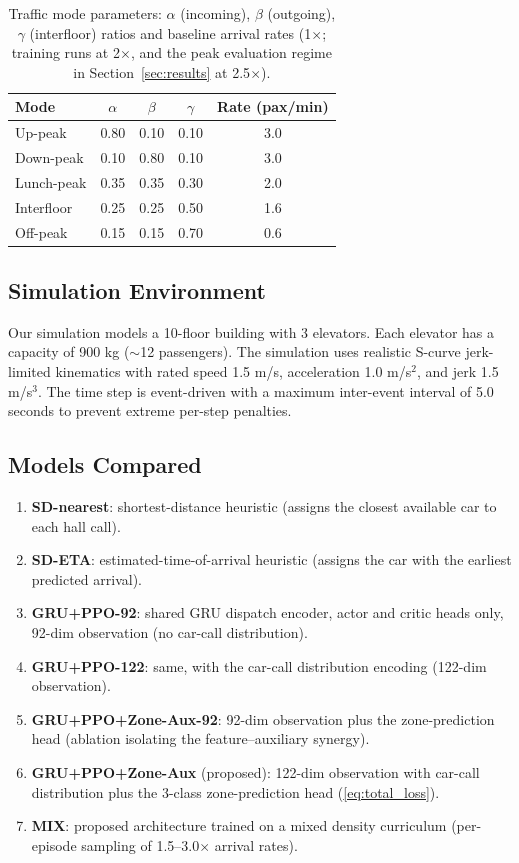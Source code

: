 \documentclass{ieeeaccess}
\begin{document}
\begin{table}[t]
\centering
\caption{Traffic mode parameters: $\alpha$ (incoming),
$\beta$ (outgoing), $\gamma$ (interfloor) ratios and baseline arrival rates
(1$\times$; training runs at 2$\times$, and the peak evaluation
regime in Section~\ref{sec:results} at 2.5$\times$).}
\label{tab:traffic_modes}
\begin{tabular}{@{}lcccc@{}}
\toprule
Mode & $\alpha$ & $\beta$ & $\gamma$ & Rate (pax/min) \\
\midrule
Up-peak & 0.80 & 0.10 & 0.10 & 3.0 \\
Down-peak & 0.10 & 0.80 & 0.10 & 3.0 \\
Lunch-peak & 0.35 & 0.35 & 0.30 & 2.0 \\
Interfloor & 0.25 & 0.25 & 0.50 & 1.6 \\
Off-peak & 0.15 & 0.15 & 0.70 & 0.6 \\
\bottomrule
\end{tabular}
\end{table}

\subsection{Simulation Environment}

Our simulation models a 10-floor building with 3 elevators. Each
elevator has a capacity of 900 kg ($\sim$12 passengers). The
simulation uses realistic S-curve jerk-limited kinematics with rated
speed 1.5 m/s, acceleration 1.0 m/s$^2$, and jerk 1.5 m/s$^3$. The
time step is event-driven with a maximum inter-event interval of 5.0
seconds to prevent extreme per-step penalties.

\subsection{Models Compared}

\begin{enumerate}
    \item \textbf{SD-nearest}: shortest-distance heuristic (assigns
    the closest available car to each hall call).
    \item \textbf{SD-ETA}: estimated-time-of-arrival heuristic
    (assigns the car with the earliest predicted arrival).
    \item \textbf{GRU+PPO-92}: shared GRU dispatch encoder, actor
    and critic heads only, 92-dim observation (no car-call
    distribution).
    \item \textbf{GRU+PPO-122}: same, with the car-call distribution
    encoding (122-dim observation).
    \item \textbf{GRU+PPO+Zone-Aux-92}: 92-dim observation plus the
    zone-prediction head (ablation isolating the feature--auxiliary
    synergy).
    \item \textbf{GRU+PPO+Zone-Aux} (proposed): 122-dim observation
    with car-call distribution plus the 3-class zone-prediction head
    (\eqref{eq:total_loss}).
    \item \textbf{MIX}: proposed architecture trained on a mixed
    density curriculum (per-episode sampling of 1.5--3.0$\times$
    arrival rates).
\end{enumerate}
\end{document}
